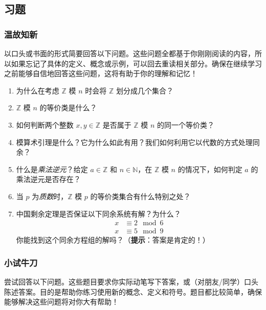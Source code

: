 
\subsection{习题}

\subsubsection*{温故知新}

以口头或书面的形式简要回答以下问题。这些问题全都基于你刚刚阅读的内容，所以如果忘记了具体的定义、概念或示例，可以回去重读相关部分。确保在继续学习之前能够自信地回答这些问题，这将有助于你的理解和记忆！

\begin{enumerate}[label=(\arabic*)]
    \item 为什么在考虑 $\mathbb{Z}$ 模 $n$ 时会将 $\mathbb{Z}$ 划分成几个集合？
    \item $\mathbb{Z}$ 模 $n$ 的等价类是什么？
    \item 如何判断两个整数 $x, y \in \mathbb{Z}$ 是否属于 $\mathbb{Z}$ 模 $n$ 的同一个等价类？
    \item 模算术引理是什么？它为什么如此有用？我们如何利用它以代数的方式处理同余？
    \item 什么是\emph{乘法逆元}？给定 $a \in \mathbb{Z}$ 和 $n \in \mathbb{N}$，在 $\mathbb{Z}$ 模 $n$ 的情况下，如何判定 $a$ 的乘法逆元是否存在？
    \item 当 $p$ 为\emph{质数}时，$\mathbb{Z}$ 模 $p$ 的等价类集合有什么特别之处？
    \item 中国剩余定理是否保证以下同余系统有解？为什么？
    \begin{align*}
        x &\equiv 2 \mod 6 \\
        x &\equiv 5 \mod 9
    \end{align*} 
    你能找到这个同余方程组的解吗？（\textbf{提示}：答案是肯定的！）
\end{enumerate}

\subsubsection*{小试牛刀}

尝试回答以下问题。这些题目要求你实际动笔写下答案，或（对朋友/同学）口头陈述答案。目的是帮助你练习使用新的概念、定义和符号。题目都比较简单，确保能够解决这些问题将对你大有帮助！

